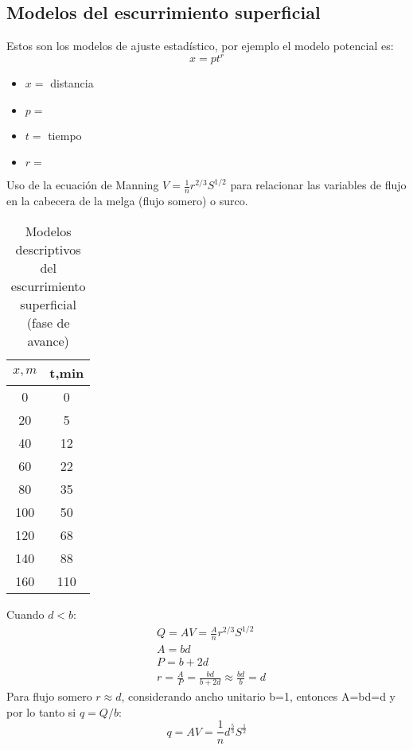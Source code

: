 \subsection{Modelos del escurrimiento superficial}
Estos son los modelos de ajuste estadístico, por ejemplo el modelo potencial es:
\begin{equation}
    x = pt^r
\end{equation}
\begin{notation}
    \begin{itemize}
        \item $x=$ distancia
        \item $p=$ 
        \item $t=$ tiempo
        \item $r=$ 
    \end{itemize}
\end{notation}
Uso de la ecuación de Manning $V= \frac{1}{n}r^{2/3}S^{1/2}$ para relacionar las variables de flujo en la cabecera de la melga (flujo somero) o surco.
\begin{table}[h!]
    \centering
    \begin{tabular}{@{}cc@{}}
    \toprule
    $x,m$ & t,min \\ \midrule
    0     & 0     \\
    20    & 5     \\
    40    & 12    \\
    60    & 22    \\
    80    & 35    \\
    100   & 50    \\
    120   & 68    \\
    140   & 88    \\
    160   & 110   \\ \bottomrule
    \end{tabular}
    \caption{Modelos descriptivos del escurrimiento superficial (fase de avance)}
    \label{tabr}
\end{table}
Cuando $d<b$:
\begin{align*}
    &Q=AV = \frac{A}{n} r^{2 /3}S^{1 /2}\\
    &A= bd\\
    &P = b + 2d\\
    &r = \frac{A}{P} = \frac{bd}{b+ 2d}\approx \frac{bd}{b} = d
\end{align*}
Para flujo somero $r\approx d$, considerando ancho unitario b=1, entonces A=bd=d y por lo tanto si $q=Q/b$:
\begin{equation}
    q = AV = \frac{1}{n}d^{\frac{5}{3}}S^{\frac{1}{2}}
\end{equation} 

